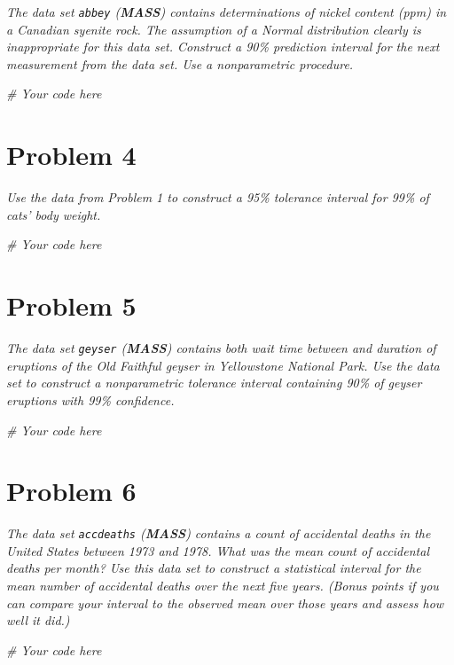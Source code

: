 \documentclass[
]{article}
\newenvironment{Shaded}{\begin{snugshade}}{\end{snugshade}}
\newcommand{\CommentTok}[1]{\textcolor[rgb]{0.56,0.35,0.01}{\textit{#1}}}
\begin{document}
\emph{The data set \texttt{abbey} (\textbf{MASS}) contains
determinations of nickel content (ppm) in a Canadian syenite rock. The
assumption of a Normal distribution clearly is inappropriate for this
data set. Construct a 90\% prediction interval for the next measurement
from the data set. Use a nonparametric procedure.}

\begin{Shaded}
\begin{Highlighting}[]
\CommentTok{\# Your code here}
\end{Highlighting}
\end{Shaded}

\hypertarget{problem-4}{%
\section{Problem 4}\label{problem-4}}

\emph{Use the data from Problem 1 to construct a 95\% tolerance interval
for 99\% of cats' body weight.}

\begin{Shaded}
\begin{Highlighting}[]
\CommentTok{\# Your code here}
\end{Highlighting}
\end{Shaded}

\hypertarget{problem-5}{%
\section{Problem 5}\label{problem-5}}

\emph{The data set \texttt{geyser} (\textbf{MASS}) contains both wait
time between and duration of eruptions of the Old Faithful geyser in
Yellowstone National Park. Use the data set to construct a nonparametric
tolerance interval containing 90\% of geyser eruptions with 99\%
confidence.}

\begin{Shaded}
\begin{Highlighting}[]
\CommentTok{\# Your code here}
\end{Highlighting}
\end{Shaded}

\hypertarget{problem-6}{%
\section{Problem 6}\label{problem-6}}

\emph{The data set \texttt{accdeaths} (\textbf{MASS}) contains a count
of accidental deaths in the United States between 1973 and 1978. What
was the mean count of accidental deaths per month? Use this data set to
construct a statistical interval for the mean number of accidental
deaths over the next five years. (Bonus points if you can compare your
interval to the observed mean over those years and assess how well it
did.)}

\begin{Shaded}
\begin{Highlighting}[]
\CommentTok{\# Your code here}
\end{Highlighting}
\end{Shaded}
\end{document}
